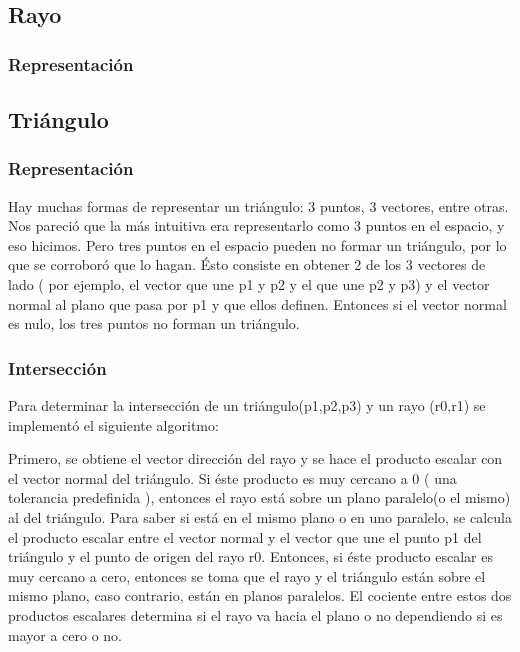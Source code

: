 \documentclass[a4paper,10pt]{article}
\begin{document}
\subsection{Rayo}

\subsubsection{Representaci\'on}

\subsection{Tri\'angulo}
\label{triangulo}
\subsubsection{Representaci\'on}

Hay muchas formas de representar un tri\'angulo: 3 puntos, 3 vectores, entre otras. Nos pareci\'o que la m\'as
intuitiva era representarlo como 3 puntos en el espacio, y eso hicimos. Pero tres puntos en el espacio pueden no
formar un triángulo, por lo que se corrobor\'o que lo hagan. \'Esto consiste en obtener 2 de los 3 vectores de lado
( por ejemplo, el vector que une p1 y p2 y el que une p2 y p3) y el vector normal al plano que pasa por p1 y que ellos definen.
Entonces si el vector normal es nulo, los tres puntos no forman un tri\'angulo.

\subsubsection{Intersecci\'on}
Para determinar la intersecci\'on de un tri\'angulo(p1,p2,p3) y un rayo (r0,r1) se implement\'o el siguiente algoritmo:

Primero, se obtiene el vector direcci\'on del rayo y se hace el producto escalar con el vector normal del tri\'angulo. Si \'este
producto es muy cercano a 0 ( una tolerancia predefinida ), entonces el rayo est\'a sobre un plano paralelo(o el mismo) al del tri\'angulo.
Para saber si est\'a en el mismo plano o en uno paralelo, se calcula el producto escalar entre el vector normal y el vector que une
el punto p1 del triángulo y el punto de origen del rayo r0. Entonces, si \'este producto escalar es muy cercano a cero, entonces se toma
que el rayo y el tri\'angulo est\'an sobre el mismo plano, caso contrario, est\'an en planos paralelos. El cociente entre estos dos productos escalares
determina si el rayo va hacia el plano o no dependiendo si es mayor a cero o no.
\end{document}
